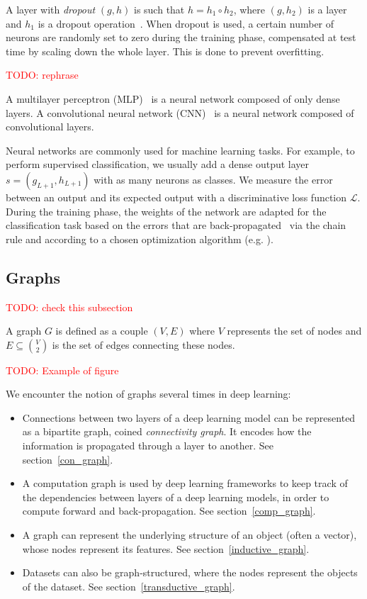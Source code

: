 \documentclass{article}
\theoremstyle{definition}
\newcommand{\todo}[1]{\textcolor{red}{TODO: #1\\}}
\begin{document}
A layer with \textit{dropout} $(g,h)$ is such that $h = h_1 \circ h_2$, where $(g,h_2)$ is a layer and $h_1$ is a dropout operation~\cite{srivastava2014dropout}. When dropout is used, a certain number of neurons are randomly set to zero during the training phase, compensated at test time by scaling down the whole layer. This is done to prevent overfitting.

\todo{rephrase}

A multilayer perceptron (MLP)~\cite{hornik1989multilayer} is a neural network composed of only dense layers.
A convolutional neural network (CNN)~\cite{lecun1998gradient} is a neural network composed of convolutional layers.

Neural networks are commonly used for machine learning tasks. For example, to perform supervised classification, we usually add a dense output layer $s=(g_{L+1},h_{L+1})$ with as many neurons as classes. We measure the error between an output and its expected output with a discriminative loss function $\mathcal{L}$. During the training phase, the weights of the network are adapted for the classification task based on the errors that are back-propagated~\cite{hornik1989multilayer} via the chain rule and according to a chosen optimization algorithm (e.g. \cite{bottou2010large}).

\subsection{Graphs}

\todo{check this subsection}

A graph $G$ is defined as a couple $(V,E)$ where $V$ represents the set of nodes and $E \subseteq\binom{V}{2}$ is the set of edges connecting these nodes.

\todo{Example of figure}

We encounter the notion of graphs several times in deep learning:
\begin{itemize}
\item Connections between two layers of a deep learning model can be represented as a bipartite graph, coined \emph{connectivity graph}. It encodes how the information is propagated through a layer to another. See section~\ref{con_graph}.
\item A computation graph is used by deep learning frameworks to keep track of the dependencies between layers of a deep learning models, in order to compute forward and back-propagation. See section~\ref{comp_graph}.
\item A graph can represent the underlying structure of an object (often a vector), whose nodes represent its features. See section~\ref{inductive_graph}.
\item Datasets can also be graph-structured, where the nodes represent the objects of the dataset. See section~\ref{transductive_graph}.
\end{itemize}
\end{document}
